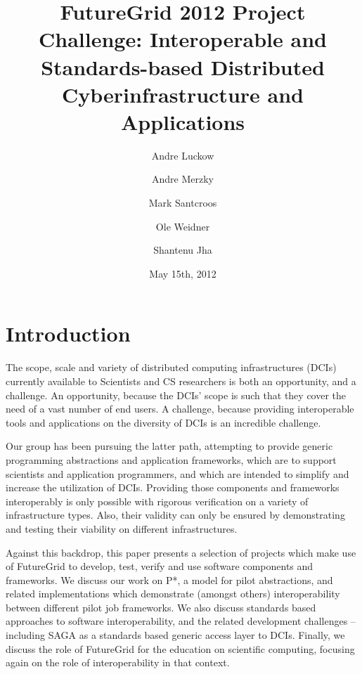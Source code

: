 \documentclass[]{paper}
\begin{document}
\title{FutureGrid 2012 Project Challenge: Interoperable and
  Standards-based Distributed Cyberinfrastructure and Applications}
 
\author{Andre Luckow 
  \and Andre Merzky
  \and Mark Santcroos
  \and Ole Weidner 
  \and Shantenu Jha
}
\date{May 15th, 2012}
\maketitle

\begin{abstract}
\end{abstract}

\section{Introduction}

The scope, scale and variety of distributed computing infrastructures
(DCIs) currently available to Scientists and CS researchers is both an
opportunity, and a challenge.  An opportunity, because the DCIs' scope
is such that they cover the need of a vast number of end users. A
challenge, because providing interoperable tools and applications on
the diversity of DCIs is an incredible challenge.

Our group has been pursuing the latter path, attempting to provide
generic programming abstractions and application frameworks, which are
to support scientists and application programmers, and which are
intended to simplify and increase the utilization of DCIs.  Providing
those components and frameworks interoperably is only possible with
rigorous verification on a variety of infrastructure types.  Also,
their validity can only be ensured by demonstrating and testing their
viability on different infrastructures.

Against this backdrop, this paper presents a selection of projects
which make use of FutureGrid to develop, test, verify and use software
components and frameworks.  We discuss our work on P*, a model for
pilot abstractions, and related implementations which demonstrate
(amongst others) interoperability between different pilot job
frameworks.  We also discuss standards based approaches to software 
interoperability, and the related development challenges -- including
SAGA as a standards based generic access layer to DCIs.  Finally, we
discuss the role of FutureGrid for the education on scientific
computing, focusing again on the role of interoperability in that
context.
\end{document}
